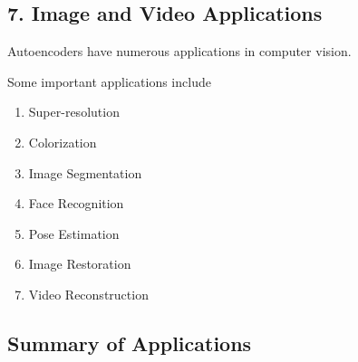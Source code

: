 \documentclass{article}
\begin{document}
	\subsection{7. Image and Video Applications}
	
	Autoencoders have numerous applications in computer vision.
	
	Some important applications include
	
	\begin{enumerate}
		\item Super-resolution
		\item Colorization
		\item Image Segmentation
		\item Face Recognition
		\item Pose Estimation
		\item Image Restoration
		\item Video Reconstruction
	\end{enumerate}
	
%			
%			
%			
%			
%			
%			
%			
%	
	\subsection{Summary of Applications}
	
\end{document}
